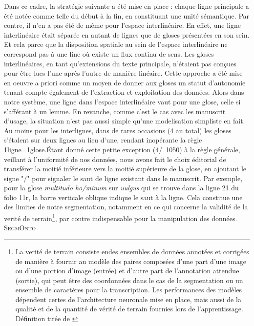 \documentclass[a4paper, twoside, 12pt]{book}
\begin{document}
Dans ce cadre, la stratégie suivante a été mise en place : chaque ligne principale a été notée comme telle du début à la fin, en constituant une unité sémantique. Par contre, il n'en a pas été de même pour l'espace interlinéaire. En effet, une ligne interlinéaire était séparée en autant de lignes que de gloses présentées en son sein. Et cela parce que la disposition spatiale au sein de l'espace interlinéaire ne correspond pas à une line où existe un flux continu de sens. Les gloses interlinéaires, en tant qu'extensions du texte principale, n'étaient pas conçues pour être lues l'une après l'autre de manière linéaire. Cette approche a été mise en oeuvre a priori comme un moyen de donner aux gloses un statut d'autonomie tenant compte également de l'extraction et exploitation des données. Alors dans notre système, une ligne dans l'espace interlinéaire vaut pour une glose, celle si s'afférant à un lemme. En revanche, comme c'est le cas avec les manuscrit d'usage, la situation n'est pas aussi simple qu'une modelisation simpliste en fait. Au moins pour les interlignes, dans de rares occasions (4 au total) les gloses s'étalent sur deux lignes au lieu d'une, rendant inopérante la règle 1ligne=1glose.Étant donné cette petite exception (4/~1050) à la règle générale, veillant à l'uniformité de nos données, nous avons fait le choix éditorial de transférer la moitié inférieure vers la moitié supérieure de la glose, en ajoutant le signe "/" pour signaler le saut de ligne existant dans le manuscrit. Par exemple, pour la glose \textit{multitudo ho/minum} sur \textit{uulgus} qui se trouve dans la ligne 21 du folio 11r, la barre verticale oblique indique le saut à la ligne. Cela constitue une des limites de notre segmentation, notamment en ce qui concerne la validité de la verité de terrain\footnote{ La verité de terrain consiste en\og{}des ensembles de données annotées et corrigées de manière à fournir au modèle des paires composées d'une part d'une image ou d'une portion d'image (entrée) et d'autre part de l’annotation attendue (sortie), qui peut être des coordonnées dans le cas de la segmentation ou un ensemble de caractères pour la transcription. Les performances des modèles dépendent certes de l'architecture neuronale mise en place, mais aussi de la qualité et de la quantité de vérité de terrain fournies lors de l'apprentissage.\fg{} Définition tirée de \cite{chague2021htr}}, par contre indispensable pour la manipulation des données. \\

\textsc{SegmOnto}
\end{document}
